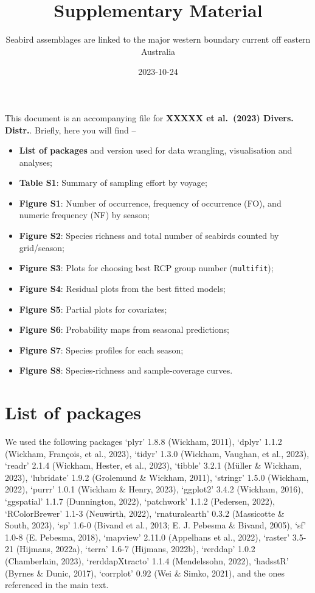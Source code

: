\documentclass[
]{article}
\title{Supplementary Material}
\subtitle{Seabird assemblages are linked to the major western boundary
current off eastern Australia}
\author{}
\date{\vspace{-2.5em}2023-10-24}
\providecommand{\tightlist}{%
  \setlength{\itemsep}{0pt}\setlength{\parskip}{0pt}}
\begin{document}
\maketitle

This document is an accompanying file for \textbf{XXXXX et al.~(2023)
Divers. Distr.}. Briefly, here you will find --

\begin{itemize}
\tightlist
\item
  \textbf{List of packages} and version used for data wrangling,
  visualisation and analyses;
\item
  \textbf{Table S1}: Summary of sampling effort by voyage;
\item
  \textbf{Figure S1}: Number of occurrence, frequency of occurrence
  (FO), and numeric frequency (NF) by season;
\item
  \textbf{Figure S2}: Species richness and total number of seabirds
  counted by grid/season;
\item
  \textbf{Figure S3}: Plots for choosing best RCP group number
  (\texttt{multifit});
\item
  \textbf{Figure S4}: Residual plots from the best fitted models;
\item
  \textbf{Figure S5}: Partial plots for covariates;
\item
  \textbf{Figure S6}: Probability maps from seasonal predictions;
\item
  \textbf{Figure S7}: Species profiles for each season;
\item
  \textbf{Figure S8}: Species-richness and sample-coverage curves.
\end{itemize}

\newpage

\hypertarget{list-of-packages}{%
\section{List of packages}\label{list-of-packages}}

We used the following packages `plyr' 1.8.8 (Wickham, 2011), `dplyr'
1.1.2 (Wickham, François, et al., 2023), `tidyr' 1.3.0 (Wickham,
Vaughan, et al., 2023), `readr' 2.1.4 (Wickham, Hester, et al., 2023),
`tibble' 3.2.1 (Müller \& Wickham, 2023), `lubridate' 1.9.2 (Grolemund
\& Wickham, 2011), `stringr' 1.5.0 (Wickham, 2022), `purrr' 1.0.1
(Wickham \& Henry, 2023), `ggplot2' 3.4.2 (Wickham, 2016), `ggspatial'
1.1.7 (Dunnington, 2022), `patchwork' 1.1.2 (Pedersen, 2022),
`RColorBrewer' 1.1-3 (Neuwirth, 2022), `rnaturalearth' 0.3.2 (Massicotte
\& South, 2023), `sp' 1.6-0 (Bivand et al., 2013; E. J. Pebesma \&
Bivand, 2005), `sf' 1.0-8 (E. Pebesma, 2018), `mapview' 2.11.0
(Appelhans et al., 2022), `raster' 3.5-21 (Hijmans, 2022a), `terra'
1.6-7 (Hijmans, 2022b), `rerddap' 1.0.2 (Chamberlain, 2023),
`rerddapXtracto' 1.1.4 (Mendelssohn, 2022), `hadsstR' (Byrnes \& Dunic,
2017), `corrplot' 0.92 (Wei \& Simko, 2021), and the ones referenced in
the main text.
\end{document}
